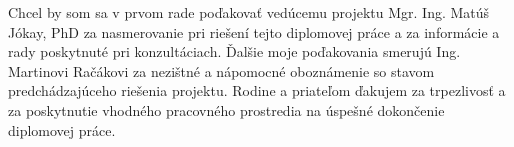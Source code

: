 Chcel by som sa v prvom rade poďakovať vedúcemu projektu Mgr. Ing. Matúš Jókay, PhD za nasmerovanie pri riešení tejto diplomovej práce a za informácie a rady poskytnuté pri konzultáciach. Ďalšie moje poďakovania smerujú Ing. Martinovi Račákovi za nezištné a nápomocné oboznámenie so stavom predchádzajúceho riešenia projektu. Rodine a priateľom ďakujem za trpezlivosť a za poskytnutie vhodného pracovného prostredia na úspešné dokončenie diplomovej práce.